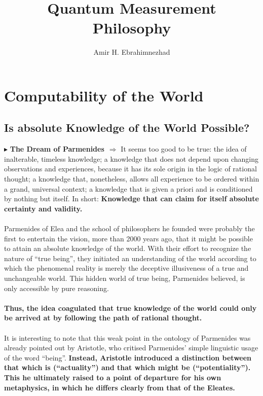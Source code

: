 \documentclass[10pt]{article}
\title{Quantum Measurement \\ \large Philosophy}
\author{Amir H. Ebrahimnezhad}
\newcommand{\newpoint}[1]{\indent $\blacktriangleright$ \textbf{#1}$\ \ \Rightarrow$}
\begin{document}
    \maketitle
    \tableofcontents
    \section{Computability of the World}
        \subsection{Is absolute Knowledge of the World Possible?}
            \newpoint{The Dream of Parmenides}
            It seems too good to be true: the idea of inalterable, timeless knowledge; a knowledge that does not depend upon changing observations and experiences, because it has its sole origin in the logic of rational thought; a knowledge that, nonetheless, allows all experience to be ordered within a grand, universal context; a knowledge that is given a priori and is conditioned by nothing but itself. In short: \textbf{Knowledge that can claim for itself absolute certainty and validity.}
            \\
            \\
            Parmenides of Elea and the school of philosophers he founded were probably the first to entertain the vision, more than 2000 years ago, that it might be possible to attain an absolute knowledge of the world. With their effort to recognize the nature of “true being”, they initiated an understanding of the world according to which the phenomenal reality is merely the deceptive illusiveness of a true and unchangeable world. This hidden world of true being, Parmenides believed, is only accessible by pure reasoning.
            \\
            \\
            \textbf{Thus, the idea coagulated that true knowledge of the world could only be arrived at by following the path of rational thought.}
            \\
            \\
            It is interesting to note that this weak point in the ontology of Parmenides was already pointed out by Aristotle, who critised Parmenides' simple linguistic usage of the word “being”. \textbf{Instead, Aristotle introduced a distinction between that which is (“actuality”) and that which might be (“potentiality”). This he ultimately raised to a point of departure for his own metaphysics, in which he differs clearly from that of the Eleates.}
\end{document}
